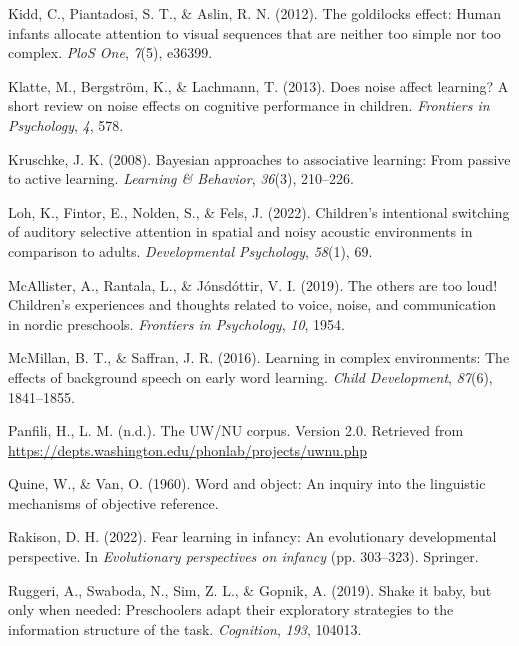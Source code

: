 \documentclass[10pt, letterpaper]{article}
\newenvironment{CSLReferences}%
  {}%
  {\par}
\begin{document}
\begin{CSLReferences}{1}{0}
\leavevmode{}%
Kidd, C., Piantadosi, S. T., \& Aslin, R. N. (2012). The goldilocks
effect: Human infants allocate attention to visual sequences that are
neither too simple nor too complex. \emph{PloS One}, \emph{7}(5),
e36399.

\leavevmode{}%
Klatte, M., Bergström, K., \& Lachmann, T. (2013). Does noise affect
learning? A short review on noise effects on cognitive performance in
children. \emph{Frontiers in Psychology}, \emph{4}, 578.

\leavevmode{}%
Kruschke, J. K. (2008). Bayesian approaches to associative learning:
From passive to active learning. \emph{Learning \& Behavior},
\emph{36}(3), 210--226.

\leavevmode{}%
Loh, K., Fintor, E., Nolden, S., \& Fels, J. (2022). Children's
intentional switching of auditory selective attention in spatial and
noisy acoustic environments in comparison to adults. \emph{Developmental
Psychology}, \emph{58}(1), 69.

\leavevmode{}%
McAllister, A., Rantala, L., \& Jónsdóttir, V. I. (2019). The others are
too loud! Children's experiences and thoughts related to voice, noise,
and communication in nordic preschools. \emph{Frontiers in Psychology},
\emph{10}, 1954.

\leavevmode{}%
McMillan, B. T., \& Saffran, J. R. (2016). Learning in complex
environments: The effects of background speech on early word learning.
\emph{Child Development}, \emph{87}(6), 1841--1855.

\leavevmode{}%
Panfili, H., L. M. (n.d.). The UW/NU corpus. Version 2.0. Retrieved from
\url{https://depts.washington.edu/phonlab/projects/uwnu.php}

\leavevmode{}%
Quine, W., \& Van, O. (1960). Word and object: An inquiry into the
linguistic mechanisms of objective reference.

\leavevmode{}%
Rakison, D. H. (2022). Fear learning in infancy: An evolutionary
developmental perspective. In \emph{Evolutionary perspectives on
infancy} (pp. 303--323). Springer.

\leavevmode{}%
Ruggeri, A., Swaboda, N., Sim, Z. L., \& Gopnik, A. (2019). Shake it
baby, but only when needed: Preschoolers adapt their exploratory
strategies to the information structure of the task. \emph{Cognition},
\emph{193}, 104013.


\end{CSLReferences}
\end{document}
